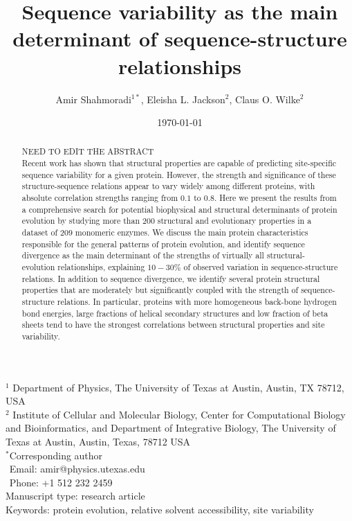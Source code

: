 \documentclass[12pt]{article}
\title{Sequence variability as the main determinant of sequence-structure relationships}
\author{Amir Shahmoradi$^{1*}$, Eleisha L. Jackson$^2$, Claus O. Wilke$^2$}
\begin{document}
\date{\today}
\maketitle


\noindent
$^1$ Department of Physics, The University of Texas at Austin, Austin, TX 78712, USA \\
$^2$ Institute of Cellular and Molecular Biology, Center for Computational Biology and Bioinformatics, and Department of Integrative Biology, The University of Texas at Austin, Austin, Texas, 78712 USA\\

\bigskip
\noindent
$^*$Corresponding author\\
$\phantom{^*}$Email: amir@physics.utexas.edu\\
$\phantom{^*}$Phone: +1 512 232 2459\\

\bigskip
\noindent
Manuscript type: research article\\
\bigskip
\noindent  Keywords: protein evolution, relative solvent accessibility, site variability


\begin{abstract}
NEED TO EDIT THE ABSTRACT\\
Recent work has shown that structural properties are capable of predicting site-specific sequence variability for a given protein. However, the strength and significance of these structure-sequence relations appear to vary widely among different proteins, with absolute correlation strengths ranging from $0.1$ to $0.8$.  Here we present the results from a comprehensive search for potential biophysical and structural determinants of protein evolution by studying more than $200$ structural and evolutionary properties in a dataset of $209$ monomeric enzymes. We discuss the main protein characteristics responsible for the general patterns of protein evolution, and identify sequence divergence as the main determinant of the strengths of virtually all structural-evolution relationships, explaining $10-30 \%$ of observed variation in sequence-structure relations. In addition to sequence divergence, we identify several protein structural properties that are moderately but significantly coupled with the strength of sequence-structure relations. In particular, proteins with more homogeneous back-bone hydrogen bond energies, large fractions of helical secondary structures and low fraction of beta sheets tend to have the strongest correlations between structural properties and site variability. 

\end{abstract}
\vfill
\vfill
\def\thefootnote{\fnsymbol{footnote}}
\setcounter{footnote}{0}
\end{document}
